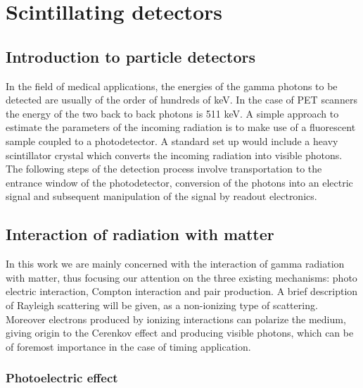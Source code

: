 

\chapter{Scintillating detectors}

\section{Introduction to particle detectors}
In the field of medical applications, the energies of the gamma photons to be detected are usually of the order of hundreds of keV. In the case of PET scanners the energy of the two back to back photons is 511 keV.
A simple approach to estimate the parameters of the incoming radiation is to make use of a fluorescent sample coupled to a photodetector. A standard set up would include a heavy scintillator crystal which converts the incoming radiation into visible photons. The following steps of the detection process involve transportation to the entrance window of the photodetector, conversion of the photons into an electric signal and subsequent manipulation of the signal by readout electronics.  


\section{Interaction of radiation with matter}
In this work we are mainly concerned with the interaction of gamma radiation with matter, thus focusing our attention on the three existing mechanisms: photo electric interaction, Compton interaction and pair production. A brief description of Rayleigh scattering will be given, as a non-ionizing type of scattering.
Moreover electrons produced by ionizing interactions can polarize the medium, giving origin to the Cerenkov effect and producing visible photons, which can be of foremost importance in the case of timing application.

\subsection{Photoelectric effect}

